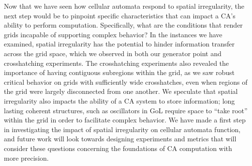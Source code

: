 \documentclass[a4paper,11pt]{article}
\begin{document}
Now that we have seen how cellular automata respond to spatial irregularity, the next step would be to pinpoint specific characteristics that can impact a CA's ability to perform computation. Specifically, what are the conditions that render grids incapable of supporting complex behavior? In the instances we have examined, spatial irregularity has the potential to hinder information transfer across the grid space, which we observed in both our generator point and crosshatching experiments. The crosshatching experiments also revealed the importance of having contiguous subregions within the grid, as we saw robust critical behavior on grids with sufficiently wide crosshatches, even when regions of the grid were largely disconnected from one another. We speculate that spatial irregularity also impacts the ability of a CA system to store information; long lasting coherent structures, such as oscillators in GoL require space to ``take root'' within the grid in order to facilitate complex behavior. We have made a first step in investigating the impact of spatial irregularity on cellular automata function, and future work will look towards designing experiments and metrics that will consider these questions concerning the foundations of CA computation with more precision.




\end{document}

